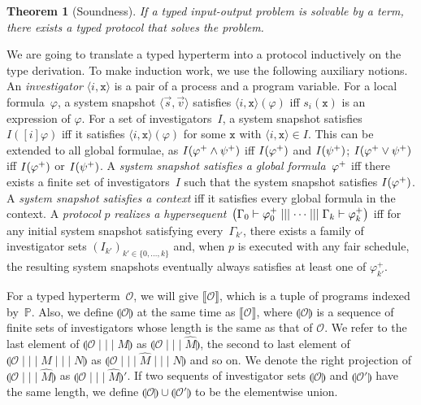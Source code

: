 \documentclass[doctor]{iscs-thesis}
\newcommand{\tuple}[1]{\langle{#1}\rangle}
\newtheorem{theorem}{Theorem}
\newcommand{\hypert}{\mathcal{O}}
\newcommand{\hmid}{\mid\mid\mid}
\newcommand{\processes}{\mathbb{P}}
\newcommand{\p}[1]{\texttt{#1}}
\newcommand{\sem}[1]{\llbracket{#1}\rrbracket}
\newcommand{\semi}[1]{\llparenthesis{#1}\rrparenthesis}
\begin{document}
\begin{theorem}[Soundness]
If a typed input-output problem is solvable by a term,
there exists a typed protocol that solves the problem.
\end{theorem}

We are going to translate a typed hyperterm into a protocol inductively
on the type derivation.
To make induction work, we use the following auxiliary notions.
An \textit{investigator} $\tuple{i, \p x}$ is a pair of a process and a program
variable.
For a local formula~$\varphi$, a system snapshot $\tuple{\vec s,\vec v}$
satisfies
$\tuple{i,\p x}(\varphi)$ iff
$s_i(\p x)$ is an expression of $\varphi$.
For a set of investigators~$I$,
a system snapshot satisfies
$I([i]\varphi)$ iff it satisfies
$\tuple{i, \p x}(\varphi)$ for some $\p x$ with
$\tuple{i,\p x}\in I$.
This can be extended to all global formulae, as
$I({\varphi}^+\wedge{\psi}^+)$ iff $I({\varphi}^+)$ and $I({\psi}^+)$;
$I({\varphi}^+\vee{\psi}^+)$ iff $I({\varphi}^+)$ or $I({\psi}^+)$.
A \textit{system snapshot satisfies a global formula}~${\varphi}^+$
iff there exists a
finite set of
investigators~$I$ such that the system snapshot satisfies $I({\varphi}^+)$.
A \textit{system snapshot satisfies a context} iff it
satisfies every global formula in the context.
A \textit{protocol} $p$ \textit{realizes a hypersequent}~$
\left(\Gamma_0\vdash
\m\varphi_0 \hmid \cdots\hmid\Gamma_{k}\vdash \m\varphi_{k}\right)$
iff
for any initial system snapshot satisfying
every~$\Gamma_{k'}$,
there exists a family of investigator sets
$(I_{k'})_{k'\in\{0,\ldots,k\}}$ and,
when $p$ is executed with any fair schedule,
the resulting system snapshots eventually always satisfies at least one of
$\varphi_{k'}^+$.

For a typed 
hyperterm~$\hypert$,
we will give $\sem{\hypert}$, which is a tuple of programs indexed
by~$\processes$.
Also, we define $\semi{\hypert}$ at the same time as
$\sem{\hypert}$, where
$\semi{\hypert}$ is a sequence of finite sets of investigators whose
length is the same as that of $\hypert$.
We refer to the last element of $\semi{\hypert\hmid M}$ as
$\semi{\hypert\hmid \hat{M}}$, the second to last element of
$\semi{\hypert\hmid M\hmid N}$ as 
$\semi{\hypert\hmid \hat M\hmid N}$ and so on.
We denote the right projection of $\semi{\hypert\hmid \hat{M}}$ as
$\semi{\hypert\hmid \hat{M}}'$.
If two sequents of investigator sets $\semi{\hypert}$ and $\semi{\hypert'}$
have the same length, we define $\semi{\hypert}\cup \semi{\hypert'}$ to
be the elementwise union.
\end{document}
